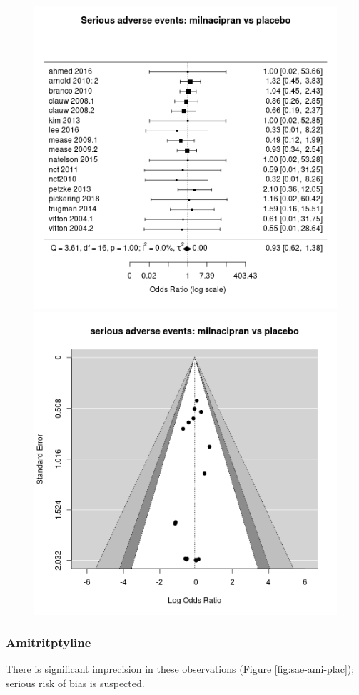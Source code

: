 \documentclass{report}\usepackage[]{graphicx}\usepackage[]{color}
\newenvironment{knitrout}{}{} %
\begin{document}
\begin{figure}


\begin{knitrout}
\color{fgcolor}
\includegraphics[width=0.5\linewidth,height=0.35\textheight]{img/serious_adverse-milnacipran-placebo-forest} 
\includegraphics[width=0.5\linewidth,height=0.35\textheight]{img/serious_adverse-milnacipran-placebo-funnel} 
\end{knitrout}

\caption[SAE, amitriptyline]{}
\label{fig:sae-milna-plac}
\end{figure}


\subsubsection{Amitritptyline}

There is significant imprecision in these observations (Figure \ref{fig:sae-ami-plac}); serious risk of bias is suspected.
\end{document}
